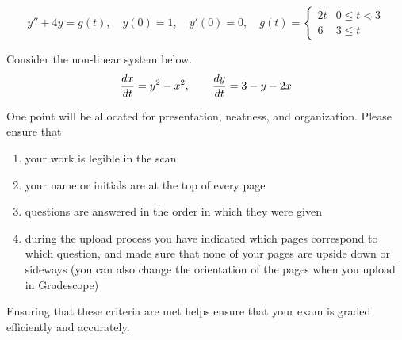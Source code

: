 \documentclass[12pt]{exam}
\begin{document}
\begin{questions}
    $$ y''+ 4y =  g(t), \quad y(0) = 1, \quad y'(0) = 0, \quad g(t) = \begin{cases} 2t & 0 \le t < 3  \\ 6 & 3 \leq t  \end{cases}$$ %
    
    \newpage \Initials
    \question[9] 
    Consider the non-linear system below.
    \[\displaystyle {\frac{dx}{dt}} = y^2-x^2, \qquad {\frac{dy}{dt}} = 3-y-2x\] %
    






    \newpage \Initials
    \question[1] One point will be allocated for presentation, neatness, and organization. Please ensure that
    \begin{enumerate}
        \item your work is legible in the scan
        \item your name or initials are at the top of every page
        \item questions are answered in the order in which they were given
        \item during the upload process you have indicated which pages correspond to which question, and made sure that none of your pages are upside down or sideways (you can also change the orientation of the pages when you upload in Gradescope)
    \end{enumerate}
    Ensuring that these criteria are met helps ensure that your exam is graded efficiently and accurately. 
    


    
\end{questions}
    
\end{document}
